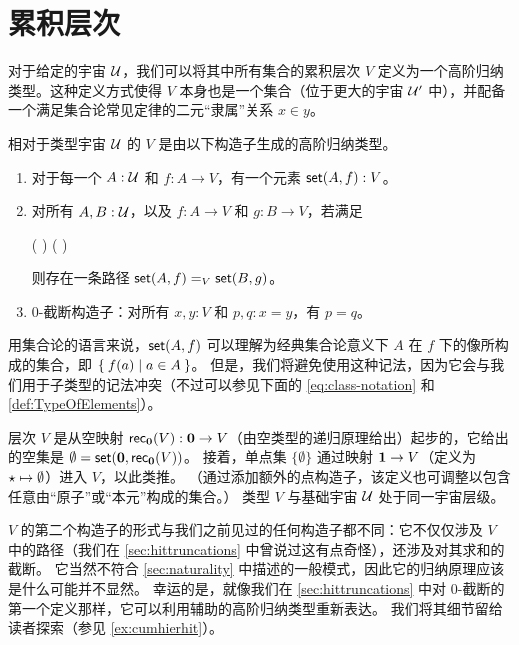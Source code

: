 %

%

\section{累积层次}
\label{sec:cumulative-hierarchy}

%
对于给定的宇宙 $\UU$，我们可以将其中所有集合的累积层次 $V$ 定义为一个高阶归纳类型。这种定义方式使得 $V$ 本身也是一个集合（位于更大的宇宙 $\UU'$ 中），并配备一个满足集合论常见定律的二元“隶属”关系 $x\in y$。

\begin{defn}\label{defn:V}
  相对于类型宇宙 $\UU$ 的
  $V$ 是由以下构造子生成的高阶归纳类型。
  \begin{enumerate}
  \item 对于每一个 $A : \UU$ 和 $f : A \to V$，有一个元素 $\vset(A, f) : V$。
  \item 对所有 $A, B : \UU$，以及 $f : A \to V$ 和 $g : B \to V$，若满足
    \begin{narrowmultline} \label{eq:V-path}
      \big(  \big) \land \narrowbreak
      \big(  \big)
    \end{narrowmultline}
    则存在一条路径 $\id[V]{\vset(A,f)}{\vset(B,g)}$。
  \item 0-截断构造子：对所有 $x,y:V$ 和 $p,q:x=y$，有 $p=q$。
  \end{enumerate}
\end{defn}

用集合论的语言来说，$\vset(A,f)$ 可以理解为经典集合论意义下 $A$ 在 $f$ 下的像所构成的集合，即 $\setof{ f(a) | a \in A }$。
但是，我们将避免使用这种记法，因为它会与我们用于子类型的记法冲突（不过可以参见下面的 \eqref{eq:class-notation} 和 \cref{def:TypeOfElements}）。

层次 $V$ 是从空映射 $\rec\emptyt(V) : \emptyt \to V$（由空类型的递归原理给出）起步的，它给出的空集是 $\emptyset = \vset(\emptyt,\rec\emptyt(V))$。
接着，单点集 $\{\emptyset\}$ 通过映射 $\unit \to V$（定义为 $\ttt \mapsto \emptyset$）进入 $V$，以此类推。
（通过添加额外的点构造子，该定义也可调整以包含任意由“原子”或“本元”构成的集合。）
类型 $V$ 与基础宇宙 $\UU$ 处于同一宇宙层级。

$V$ 的第二个构造子的形式与我们之前见过的任何构造子都不同：它不仅仅涉及 $V$ 中的路径（我们在 \cref{sec:hittruncations} 中曾说过这有点奇怪），还涉及对其求和的截断。
它当然不符合 \cref{sec:naturality} 中描述的一般模式，因此它的归纳原理应该是什么可能并不显然。
幸运的是，就像我们在 \cref{sec:hittruncations} 中对 0-截断的第一个定义那样，它可以利用辅助的高阶归纳类型重新表达。
我们将其细节留给读者探索（参见 \cref{ex:cumhierhit}）。

